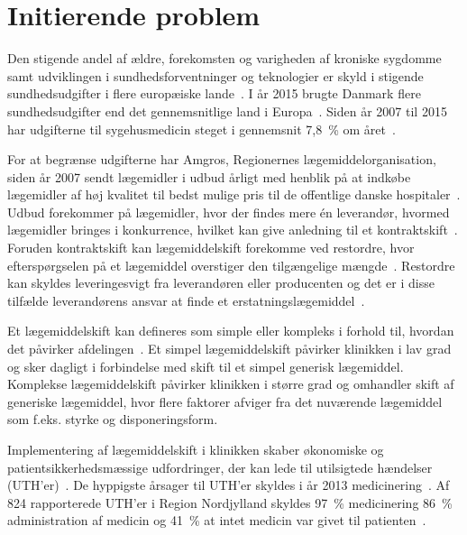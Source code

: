\chapter{Initierende problem}
Den stigende andel af ældre, forekomsten og varigheden af kroniske sygdomme samt udviklingen i sundhedsforventninger og teknologier er skyld i stigende sundhedsudgifter i flere europæiske lande~\citep{Ess2003}. I år 2015 brugte Danmark flere sundhedsudgifter end det gennemsnitlige land i Europa~\citep{EU2017}. Siden år 2007 til 2015 har udgifterne til sygehusmedicin steget i gennemsnit  7,8~\% om året~\citep{Sundhed2016}.

For at begrænse udgifterne har Amgros, Regionernes lægemiddelorganisation, siden år 2007 sendt lægemidler i udbud årligt med henblik på at indkøbe lægemidler af høj kvalitet til bedst mulige pris til de offentlige danske hospitaler~\citep{Sygehusapoteket2017}. Udbud forekommer på lægemidler, hvor der findes mere én leverandør, hvormed lægemidler bringes i konkurrence, hvilket kan give anledning til et kontraktskift~\citep{Amgros2015}. Foruden kontraktskift kan lægemiddelskift forekomme ved restordre, hvor efterspørgselen på et lægemiddel overstiger den tilgængelige mængde~\citep{Amgros2015}. Restordre kan skyldes leveringesvigt fra leverandøren eller producenten og det er i disse tilfælde leverandørens ansvar at finde et erstatningslægemiddel~\citep{Laegemiddelinformaion2017, Amgros2017}. 

Et lægemiddelskift kan defineres som simple eller kompleks i forhold til, hvordan det påvirker afdelingen~\citep{Laegemiddelinformaion2017, Sygehusapoteket2017a}. Et simpel lægemiddelskift påvirker klinikken i lav grad og sker dagligt i forbindelse med skift til et simpel generisk lægemiddel. %
Komplekse lægemiddelskift påvirker klinikken i større grad og omhandler skift af  generiske lægemiddel, hvor flere faktorer afviger fra det nuværende lægemiddel som f.eks. styrke og disponeringsform.~\citep{Laegemiddelinformaion2017, Sygehusapoteket2017a}

Implementering af lægemiddelskift i klinikken skaber økonomiske og patientsikkerhedsmæssige udfordringer, der kan lede til utilsigtede hændelser (UTH'er)~\citep{Laegemiddelinformaion2017, Sygehusapoteket2017a}. De hyppigste årsager til UTH'er skyldes i år 2013 medicinering~\citep{Patientombuddet2013}. Af 824 rapporterede UTH'er i Region Nordjylland skyldes 97~\% medicinering 86~\% administration af medicin og 41~\% at intet medicin var givet til patienten~\citep{Jensen2014}.

